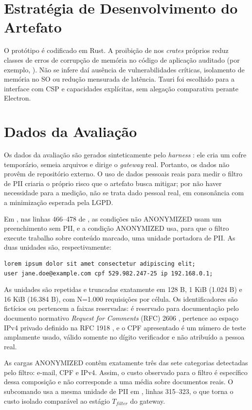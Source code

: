 \documentclass[12pt,openright,twoside,a4paper,english,brazil]{abntex2}
\begin{document}
\section{Estratégia de Desenvolvimento do Artefato}
O protótipo é codificado em Rust. A proibição de  nos \textit{crates} próprios reduz classes de erros de corrupção de memória no código de aplicação auditado (por exemplo, ). Não se infere daí ausência de vulnerabilidades críticas, isolamento de memória no SO ou redução mensurada de latência. Tauri foi escolhido para a interface com CSP e capacidades explícitas, sem alegação comparativa perante Electron.

\section{Dados da Avaliação}
\label{sec:dados-avaliacao}
Os dados da avaliação são gerados sinteticamente pelo \textit{harness} : ele cria um cofre temporário, semeia arquivos e dirige o \textit{gateway} real. Portanto, os dados não provêm de repositório externo. O uso de dados pessoais reais para medir o filtro de PII criaria o próprio risco que o artefato busca mitigar; por não haver necessidade para a medição, não se trata dado pessoal real, em consonância com a minimização esperada pela LGPD.

Em , nas linhas 466--478 de , as condições não ANONYMIZED usam um preenchimento sem PII, e a condição ANONYMIZED usa, para que o filtro execute trabalho sobre conteúdo marcado, uma unidade portadora de PII. As duas unidades são, respectivamente:
\begingroup
\footnotesize
\begin{verbatim}
lorem ipsum dolor sit amet consectetur adipiscing elit;
user jane.doe@example.com cpf 529.982.247-25 ip 192.168.0.1;
\end{verbatim}
\endgroup
As unidades são repetidas e truncadas exatamente em 128 B, 1 KiB (1.024 B) e 16 KiB (16.384 B), com N=1.000 requisições por célula. Os identificadores são fictícios ou pertencem a faixas reservadas:  é reservado para documentação pelo documento normativo \textit{Request for Comments} (RFC) 2606 \cite{rfc2606},  pertence ao espaço IPv4 privado definido na RFC 1918 \cite{rfc1918}, e o CPF apresentado é um número de teste amplamente usado, válido somente no dígito verificador e não atribuído a pessoa real.

As cargas ANONYMIZED contêm exatamente três das sete categorias detectadas pelo filtro: e-mail, CPF e IPv4. Assim, o custo observado para o filtro é específico dessa composição e não corresponde a uma média sobre documentos reais. O subcomando  usa a mesma unidade de PII em , linhas 315--323, o que torna o custo isolado comparável ao estágio $T_{filter}$ do gateway.
\end{document}
